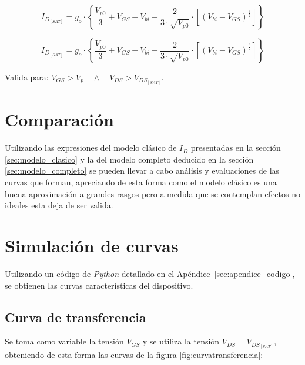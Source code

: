 \documentclass[a4paper]{article}
\begin{document}
	\begin{equation} \label{equation:ID_SAT_COMPLETA_3}
		I_{D_{[SAT]}} = g_o \cdot	\left\{ \frac{ V_{p0}}{3} + V_{GS} -  V_{bi}  + \frac{2}{3 \cdot \sqrt{V_{p0}}} \cdot \left[  ( V_{bi} - V_{GS})^{\frac{3}{2}} \right] \right\} 
	\end{equation}



\begin{tcolorbox}[colback=black!5!white, colframe=black!75!black, title=Expresión de la corriente $	I_{D_{[SAT]}} $ (modelo completo)]
	
	
	\begin{equation} \label{equation:Expresion_Completa_IDSAT}
	I_{D_{[SAT]}} = g_o \cdot	\left\{ \frac{ V_{p0}}{3} + V_{GS} -  V_{bi}  + \frac{2}{3 \cdot \sqrt{V_{p0}}} \cdot \left[  ( V_{bi} - V_{GS})^{\frac{3}{2}} \right] \right\}  
	\end{equation}
	
	Valida para: $ V_{GS} > V_p \quad \wedge \quad V_{DS} > V_{DS_{[SAT]}}$.
\end{tcolorbox}

	
\section{Comparación}

Utilizando las expresiones del modelo clásico de $I_D$ presentadas en la sección \ref{sec:modelo_clasico} y la del modelo completo deducido en la sección \ref{sec:modelo_completo} se pueden llevar a cabo análisis y evaluaciones de las curvas que forman, apreciando de esta forma como el modelo clásico es una buena aproximación a grandes rasgos pero a medida que se contemplan efectos no ideales esta deja de ser valida.  

\section{Simulación de curvas}

Utilizando un código de \textit{Python} detallado en el Apéndice~\ref{sec:apendice_codigo}, se obtienen las curvas características del dispositivo.

\subsection{Curva de transferencia}

Se toma como variable la tensión $V_{GS}$ y se utiliza la tensión $V_{DS} = V_{DS_{[SAT]}}$, obteniendo de esta forma las curvas de la figura \ref{fig:curvatransferencia}:
\end{document}

